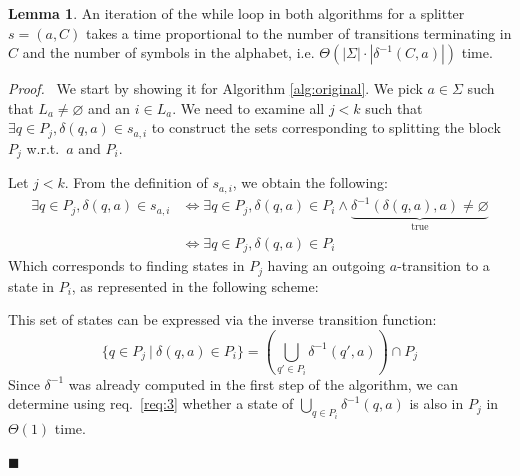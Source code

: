 \documentclass[12pt, a4 paper]{article}
\renewenvironment{proof}[1][Proof]{\begin{mdframed}[backgroundcolor=black!5, topline=false, rightline=false, bottomline=false, linecolor=black!15, linewidth=3pt]{\noindent\textit{#1.}\ }}{\noindent\par\hfill$\blacksquare$\end{mdframed}}
\theoremstyle{definition}
\newtheorem{lemma}{Lemma}
\begin{document}
\begin{lemma}\label{lem:time_iteration}
    An iteration of the while loop in both algorithms for a splitter $s = (a, C)$ takes a time proportional to the number of transitions terminating in $C$ and the number of symbols in the alphabet, i.e. $\Theta\left(\left| \Sigma \right| \cdot \left| \delta^{-1}(C, a) \right| \right)$ time.
\end{lemma}
\begin{proof}
    We start by showing it for Algorithm \ref{alg:original}. We pick $a \in \Sigma$ such that $L_a \neq \varnothing$ and an $i \in L_a$. We need to examine all $j < k$ such that $\exists q \in P_j, \delta(q, a) \in s_{a,i}$ to construct the sets corresponding to splitting the block $P_j$ w.r.t.\ $a$ and $P_i$.

    Let $j < k$. From the definition of $s_{a,i}$, we obtain the following:
    \begin{align*}
        \exists q \in P_j, \delta(q, a) \in s_{a,i} &\iff \exists q \in P_j, \delta(q, a) \in P_i \land \underset{\text{true}}{\underbrace{\delta^{-1}(\delta(q, a), a) \neq \varnothing}} \\
        & \iff \exists q \in P_j, \delta(q, a) \in P_i
    \end{align*}
    Which corresponds to finding states in $P_j$ having an outgoing $a$-transition to a state in $P_i$, as represented in the following scheme:
    \begin{center}
    \end{center}
    This set of states can be expressed via the inverse transition function:
    $$ \{q \in P_j\ |\ \delta(q,a) \in P_i \} = \left( \bigcup_{q' \in P_i} \delta^{-1}(q', a)\right) \cap P_j $$
    Since $\delta^{-1}$ was already computed in the first step of the algorithm, we can determine using req.\ \ref{req:3} whether a state of $\bigcup_{q \in P_i} \delta^{-1}(q, a)$ is also in $P_j$ in $\Theta(1)$ time.
    

\end{proof}
\end{document}
